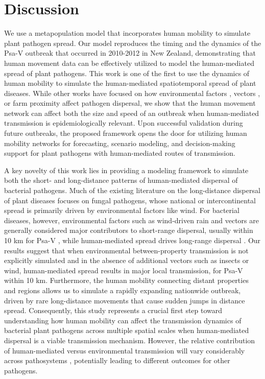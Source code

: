 \documentclass[aps,physrev,reprint,superscriptaddress]{revtex4-1}
\begin{document}
\section{Discussion}

We use a metapopulation model that incorporates human mobility to simulate plant pathogen spread.  Our model reproduces the timing and the dynamics of the Psa-V outbreak that occurred in 2010-2012 in New Zealand,  demonstrating that human movement data can be effectively utilized to model the human-mediated spread of plant pathogens. This work is one of the first to use the dynamics of human mobility to simulate the human-mediated spatiotemporal spread of plant diseases. While other works have focused on how environmental factors \cite{brown2002aerial,cendoya_individual-based_2024}, vectors \cite{ellis2025, godding2023developing}, or farm proximity \cite{strona2017network} affect pathogen dispersal, we show that the human movement network can affect both the size and speed of an outbreak when human-mediated transmission is epidemiologically relevant. Upon successful validation during future outbreaks, the proposed framework opens the door for utilizing human mobility networks for forecasting, scenario modeling, and decision-making support for plant pathogens with human-mediated routes of transmission. 

A key novelty of this work lies in providing a modeling framework to simulate both the short- and long-distance patterns of human-mediated dispersal of bacterial pathogens. Much of the existing literature \cite{pan2010prediction,radici2022early,sutrave2012identifying} on the long-distance dispersal of plant diseases focuses on fungal pathogens, whose national or intercontinental spread is primarily driven by environmental factors like wind. For bacterial diseases, however, environmental factors such as wind-driven rain \cite{froud2015review} and vectors \cite{ellis2025} are generally considered major contributors to short-range dispersal, usually within 10 km for Psa-V \cite{rosanowski2013quantification}, while human-mediated spread drives long-range dispersal \cite{froud2015review, donati2020pseudomonas}. Our results suggest that when environmental between-property transmission is not explicitly simulated and in the absence of additional vectors such as insects or wind, human-mediated spread results in major local transmission, for Psa-V within 10 km. Furthermore, the human mobility connecting distant properties and regions allows us to simulate a rapidly expanding nationwide outbreak, driven by rare long-distance movements that cause sudden jumps in distance spread. Consequently, this study represents a crucial first step toward understanding how human mobility can affect the transmission dynamics of bacterial plant pathogens across multiple spatial scales when human-mediated dispersal is a viable transmission mechanism. However, the relative contribution of human-mediated versus environmental transmission will vary considerably across pathosystems \cite{chaves2025, szyniszewska2021smallholder}, potentially leading to different outcomes for other pathogens.
\end{document}
